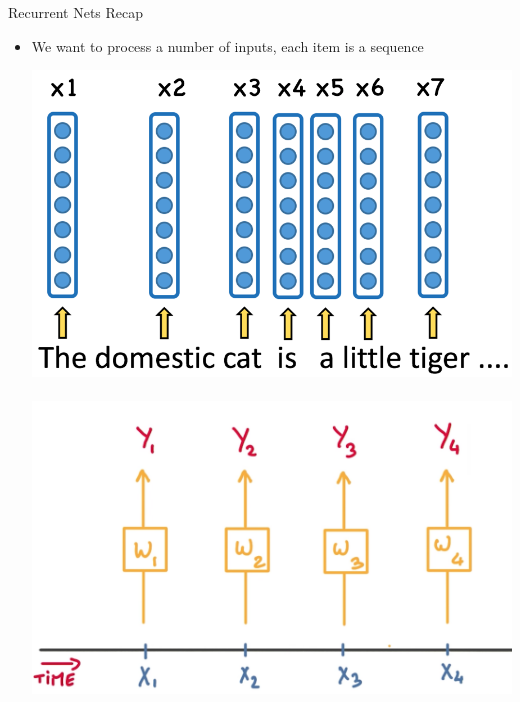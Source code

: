 \documentclass{beamer}
\begin{document}
\begin{frame}{Recurrent Nets Recap}
	\begin{itemize}
		\item We want to process a number of inputs, each item is a sequence 
		
		\begin{center}
			 \includegraphics[scale=0.13]{img/emb}~~
			 \includegraphics[scale=0.11]{img/rec}
		\end{center}
		

\end{itemize}
\end{frame}
\end{document}
